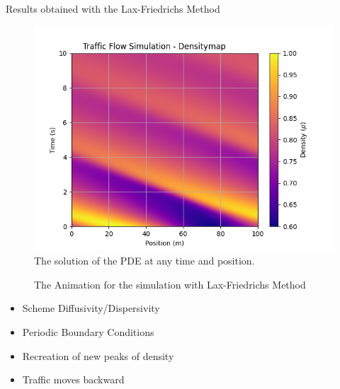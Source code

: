 \documentclass{beamer}
\begin{document}
\begin{frame}{Results obtained with the Lax-Friedrichs Method}
	\vspace{-0.4cm}
	\begin{minipage}[t]{0.48\linewidth}
		\begin{figure}
			\centering
		\includegraphics[width=\linewidth]{traffic_flow_density_map_LF.png}
		\caption{ The solution of the PDE at any time and position.}
		\label{fig:traffic_flow_density_map_LF}
		\end{figure}
	\end{minipage}
	\hfill
	\begin{minipage}[t]{0.48\linewidth}
		\begin{figure}
			\centering
			\caption{The Animation for the simulation with Lax-Friedrichs Method}
			\label{fig:lax_friedrichs_animation}
		\end{figure}
	\end{minipage}
	\vspace{-0.2cm}
	\begin{block}{}
		\begin{multicols}{2}
			\begin{itemize}
				\small
				\item Scheme Diffusivity/Dispersivity
				\item Periodic Boundary Conditions 
				\item Recreation of new peaks of density
				\item Traffic moves backward
			\end{itemize}
		\end{multicols}
	\end{block}
\end{frame}
\end{document}
